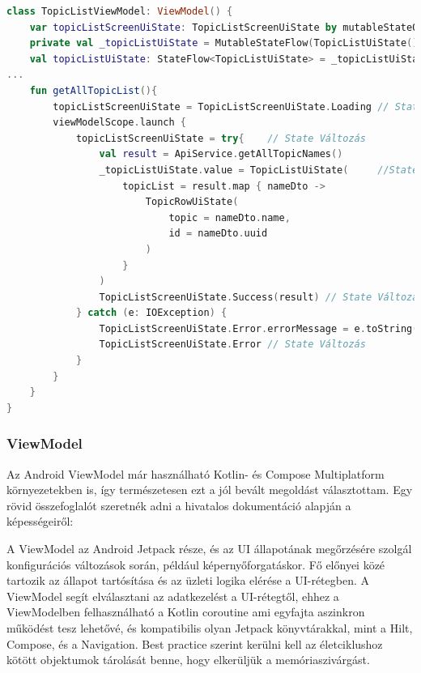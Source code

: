 \begin{lstlisting}[caption={Példa a State és StateFlow használatára.}, label={lst:state}, language=Kotlin]
class TopicListViewModel: ViewModel() {
    var topicListScreenUiState: TopicListScreenUiState by mutableStateOf(TopicListScreenUiState.Loading)
    private val _topicListUiState = MutableStateFlow(TopicListUiState())
    val topicListUiState: StateFlow<TopicListUiState> = _topicListUiState
...
    fun getAllTopicList(){
        topicListScreenUiState = TopicListScreenUiState.Loading // State Változás
        viewModelScope.launch {
            topicListScreenUiState = try{    // State Változás
                val result = ApiService.getAllTopicNames()
                _topicListUiState.value = TopicListUiState(     //StateFlow Változás
                    topicList = result.map { nameDto ->
                        TopicRowUiState(
                            topic = nameDto.name,
                            id = nameDto.uuid
                        )
                    }
                )
                TopicListScreenUiState.Success(result) // State Változás
            } catch (e: IOException) {
                TopicListScreenUiState.Error.errorMessage = e.toString()// "Network error"
                TopicListScreenUiState.Error // State Változás
            }
        }
    }
}
\end{lstlisting}

\subsubsection{ViewModel}
\label{sec:ViewModel}

Az Android ViewModel már használható Kotlin- és Compose Multiplatform környezetekben is\cite{ViewModelKMP}, így természetesen ezt a jól bevált megoldást választottam.
Egy rövid összefoglalót szeretnék adni a hivatalos dokumentáció alapján a képességeiről:\cite{ViewModelAndroid}

A ViewModel az Android Jetpack része, és az UI állapotának megőrzésére szolgál konfigurációs változások során, például képernyőforgatáskor.  Fő előnyei közé tartozik az állapot tartósítása és az üzleti logika elérése a UI-rétegben. A ViewModel segít elválasztani az adatkezelést a UI-rétegtől, ehhez a ViewModelben felhasználható a Kotlin coroutine ami egyfajta aszinkron működést tesz lehetővé, és kompatibilis olyan Jetpack könyvtárakkal, mint a Hilt, Compose, és a Navigation. Best practice szerint kerülni kell az életciklushoz kötött objektumok tárolását benne, hogy elkerüljük a memóriaszivárgást. 

